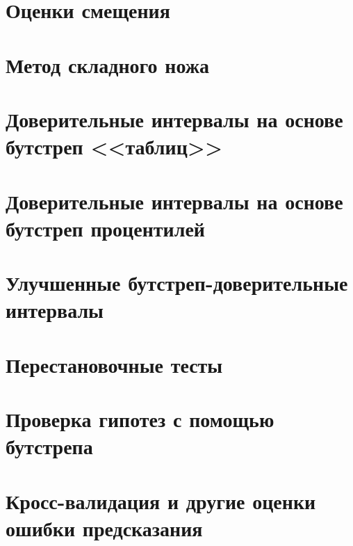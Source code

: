 \documentclass[12pt,a4paper,final]{report}
\begin{document}
\setcounter{chapter}{9}
\chapter{Оценки смещения}







\chapter{Метод складного ножа}








\chapter{Доверительные интервалы на основе бутстреп <<таблиц>>}






%

\chapter{Доверительные интервалы на основе бутстреп процентилей}








%

\setcounter{chapter}{13}
\chapter{Улучшенные бутстреп-доверительные интервалы}






\chapter{Перестановочные тесты}






\chapter{Проверка гипотез с помощью бутстрепа}







\chapter{Кросс-валидация и другие оценки ошибки предсказания}








\end{document}
